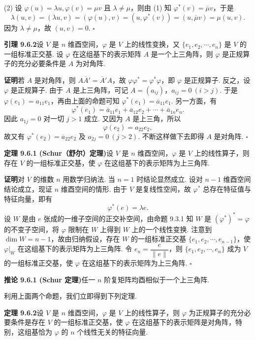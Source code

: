 \documentclass[UTF8, 12pt, fontset=fandol, oneside]{ctexart}
\begin{document}
(2) 设 $\varphi(u)=\lambda u,\varphi(v)=\mu v$ 且 $\lambda\ne\mu$，则由 (1) 知 $\varphi^*(v)=\overline\mu v$，于是
\[
  \lambda(u,v)=(\lambda u,v)=(\varphi(u),v)=(u,\varphi^*(v))=(u,\overline\mu v)=\mu(u,v).
\]
因为 $\lambda\ne\mu$，故 $(u,v)=0$. $\square$

\noindent\textbf{引理 9.6.2}\quad 设 $V$ 是 $n$ 维酉空间，$\varphi$ 是 $V$ 上的线性变换，又 $\{e_1,e_2,\cdots,e_n\}$ 是 $V$ 的一组标准正交基. 设 $\varphi$ 在这组基下的表示矩阵 $A$ 是一个上三角阵，则 $\varphi$ 是正规算子的充分必要条件是 $A$ 为对角阵.

\noindent\textbf{证明}\quad 若 $A$ 是对角阵，则 $A\overline A'=\overline A'A$，故 $\varphi\varphi^*=\varphi^*\varphi$，即 $\varphi$ 是正规算子. 反之，设 $\varphi$ 是正规算子. 由于 $A$ 是上三角阵，可记 $A=(a_{ij})$，$a_{ij}=0\ (i>j)$. 于是 $\varphi(e_1)=a_{11}e_1$，再由上面的命题可知 $\varphi^*(e_1)=\overline a_{11}e_1$. 另一方面，有
\[
  \varphi^*(e_1)=\overline a_{11}e_1+\overline a_{12}e_2+\cdots+\overline a_{1n}e_n.
\]
因此 $a_{1j}=0$ 对一切 $j>1$ 成立. 又因为 $A$ 是上三角，所以
\[
  \varphi(e_2)=a_{22}e_2,
\]
故又有 $\varphi^*(e_2)=\overline a_{22}e_2$ 及 $a_{2j}=0\ (j>2)$. 不断这样做下去即得 $A$ 是对角阵. $\square$

\noindent\textbf{定理 9.6.1 (Schur（舒尔）定理)}\quad 设 $V$ 是 $n$ 维酉空间，$\varphi$ 是 $V$ 上的线性算子，则存在 $V$ 的一组标准正交基，使 $\varphi$ 在这组基下的表示矩阵为上三角阵.

\noindent\textbf{证明}\quad 对 $V$ 的维数 $n$ 用数学归纳法. 当 $n=1$ 时结论显然成立. 设对 $n-1$ 维酉空间结论成立，现证 $n$ 维酉空间的情形. 由于 $V$ 是复线性空间，故 $\varphi^*$ 总存在特征值与特征向量，即有
\[
  \varphi^*(e)=\lambda e.
\]
设 $W$ 是由 $e$ 张成的一维子空间的正交补空间，由命题 9.3.1 知 $W$ 是 $(\varphi^*)^*=\varphi$ 的不变子空间，将 $\varphi$ 限制在 $W$ 上得到 $W$ 上的一个线性变换. 注意到 $\dim W=n-1$，故由归纳假设，存在 $W$ 的一组标准正交基 $\{e_1,e_2,\cdots,e_{n-1}\}$，使 $\varphi|_W$ 在这组基下的表示矩阵为上三角阵. 令 $e_n=\dfrac{e}{\|e\|}$，则 $\{e_1,e_2,\cdots,e_n\}$ 成为 $V$ 的一组标准正交基，使 $\varphi$ 在这组基下的表示矩阵为上三角阵. $\square$

\noindent\textbf{推论 9.6.1 (Schur 定理)}\quad 任一 $n$ 阶复矩阵均酉相似于一个上三角阵.

利用上面两个命题，我们立即得到下列定理.

\noindent\textbf{定理 9.6.2}\quad 设 $V$ 是 $n$ 维酉空间，$\varphi$ 是 $V$ 上的线性算子，则 $\varphi$ 为正规算子的充分必要条件是存在 $V$ 的一组标准正交基，使 $\varphi$ 在这组基下的表示矩阵是对角阵，特别，这组基恰为 $\varphi$ 的 $n$ 个线性无关的特征向量.
\end{document}
